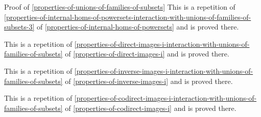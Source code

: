 \begin{Proof}{Proof of \cref{properties-of-unions-of-families-of-subsets}}
    This is a repetition of \cref{properties-of-internal-homs-of-powersets-interaction-with-unions-of-families-of-subsets-3} of \cref{properties-of-internal-homs-of-powersets} and is proved there.

    This is a repetition of \cref{properties-of-direct-images-i-interaction-with-unions-of-families-of-subsets} of \cref{properties-of-direct-images-i} and is proved there.

    This is a repetition of \cref{properties-of-inverse-images-i-interaction-with-unions-of-families-of-subsets} of \cref{properties-of-inverse-images-i} and is proved there.

    This is a repetition of \cref{properties-of-codirect-images-i-interaction-with-unions-of-families-of-subsets} of \cref{properties-of-codirect-images-i} and is proved there.


\end{Proof}
